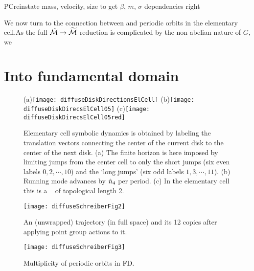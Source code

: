 \documentclass[aps,pre,preprint,groupedaddress, floatfix]{revtex4-1}
\begin{document}
PC{reinstate mass, velocity, size to get $\beta$, $m$, $\sigma$
    dependencies right}

We now turn to the connection between  and periodic
orbits in the elementary cell.As the full $\hat {{\cal M}} \rightarrow {\widetilde
{\ensuremath{{\cal M}}}}$ reduction is complicated by the non-abelian nature of $G$, we


\section{Into fundamental domain}
\label{s-SymmetryReduction}

\begin{figure}
\begin{center}
(a)\texttt{[image: diffuseDiskDirectionsElCell]}
(b)\texttt{[image: diffuseDiskDirecsElCell05]}
(c)\texttt{[image: diffuseDiskDirecsElCell05red]}
\end{center}
\caption{
Elementary cell symbolic dynamics is obtained by labeling the translation
vectors connecting the center of the current disk to the center of the
next disk.
(a) The finite horizon is here imposed by limiting jumps from the
center cell to only the short jumps (six even labels $0, 2,\cdots,10$)
and the `long jumps' (six odd labels $1, 3,\cdots,11$).
(b) Running mode  advances by $\hat n_4$ per period.
(c) In the elementary cell this is a \po\ 
    of topological length 2.
    }
\label{diskDirectionsElCell}
\end{figure}


\begin{figure}[htbp]
\begin{center}
\texttt{[image: diffuseSchreiberFig2]}
\end{center}
\caption[]{ \label{fig:schrieberFig2}
An (unwrapped) trajectory (in full space) and its 12 copies after
applying point group actions to it.}
\end{figure}

\begin{figure}[htbp]
\begin{center}
\texttt{[image: diffuseSchreiberFig3]}
\caption[]{Multiplicity of periodic orbits in FD. \label{fig:schrieberFig3}}
\end{center}

\end{figure}
\end{document}
